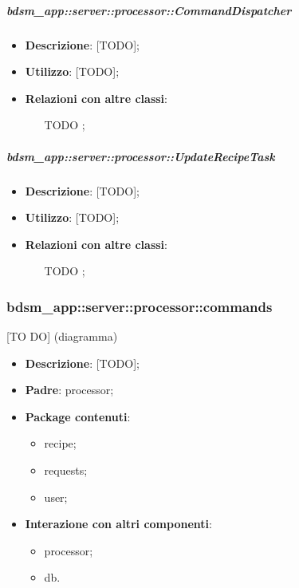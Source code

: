     \subparagraph{bdsm\_app::server::processor::CommandDispatcher} %
    \label{subp:bdsm_app_server_:processor_commanddispatcher}
    \begin{itemize}
      \item \textbf{Descrizione}: [TODO];
      \item \textbf{Utilizzo}: [TODO];
      \item \textbf{Relazioni con altre classi}:
        \begin{itemize}
          \item [TODO];
        \end{itemize}
      \end{itemize}

    \subparagraph{bdsm\_app::server::processor::UpdateRecipeTask} %
    \label{subp:bdsm_app_server_processor_updaterecipetask}
    \begin{itemize}
      \item \textbf{Descrizione}: [TODO];
      \item \textbf{Utilizzo}: [TODO];
      \item \textbf{Relazioni con altre classi}:
        \begin{itemize}
          \item [TODO];
        \end{itemize}
    \end{itemize}


    \subsubsection{bdsm\_app::server::processor::commands} %
    \label{ssub:bdsm_app_server_processor_commands}
    [TO DO] (diagramma) \newline \newline

    \begin{itemize}
      \item \textbf{Descrizione}: [TODO];
      \item \textbf{Padre}: processor;
      \item \textbf{Package contenuti}:
        \begin{itemize}
          \item recipe;
          \item requests;
          \item user;
        \end{itemize}
      \item \textbf{Interazione con altri componenti}:
        \begin{itemize}
          \item processor;
          \item db.
        \end{itemize}
    \end{itemize}

